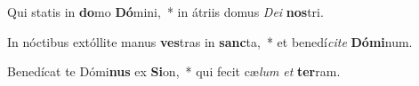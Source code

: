 \item Qui statis in \textbf{do}mo \textbf{Dó}mini,~* in átriis domus \textit{De}\textit{i} \textbf{nos}tri.
\item In nóctibus extóllite manus \textbf{ves}tras in \textbf{sanc}ta,~* et benedí\textit{ci}\textit{te} \textbf{Dó}\textbf{mi}num.
\item Benedícat te Dómi\textbf{nus} ex \textbf{Si}on,~* qui fecit cæ\textit{lum} \textit{et} \textbf{ter}ram.
